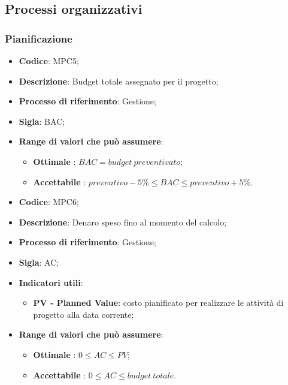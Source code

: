 \subsection{Processi organizzativi}
\subsubsection{Pianificazione}
\vspace{-1cm}
\begin{itemize}
	\item \textbf{Codice}: MPC5;
	\item \textbf{Descrizione}: Budget totale assegnato per il progetto;
	\item \textbf{Processo di riferimento}: Gestione;
	\item \textbf{Sigla}: BAC;
	\item \textbf{Range di valori che può assumere}: 
		\begin{itemize}
			\item \textbf{Ottimale} : $BAC = budget \ preventivato$;
			\item \textbf{Accettabile} : $preventivo - 5 \% \leq BAC \leq preventivo + 5 \%$.
		\end{itemize}
\end{itemize}
\vspace{-1cm}
\begin{itemize}
	\item \textbf{Codice}: MPC6;
	\item \textbf{Descrizione}: Denaro speso fino al momento del calcolo;
	\item \textbf{Processo di riferimento}: Gestione;
	\item \textbf{Sigla}: AC;
	\item \textbf{Indicatori utili}: 
		\begin{itemize}
			\item \textbf{PV - Planned Value}: costo pianificato per realizzare le attività di progetto alla data corrente;
		\end{itemize}
	\item \textbf{Range di valori che può assumere}: 
		\begin{itemize}
			\item \textbf{Ottimale} : $0 \leq AC \leq PV $;
			\item \textbf{Accettabile} : $0 \leq AC \leq budget \ totale $.
		\end{itemize}
\end{itemize}
